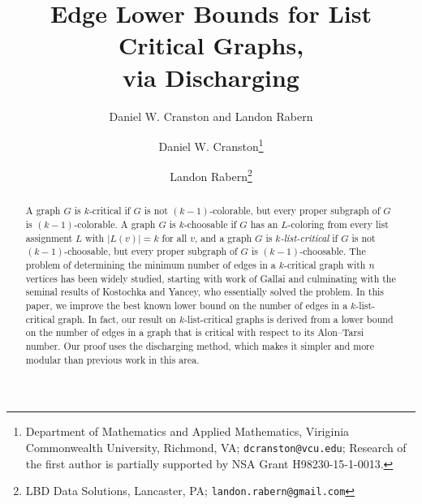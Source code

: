 \documentclass[12pt]{article}
\title{Edge Lower Bounds for List Critical Graphs,\\ via Discharging}
\author{Daniel W. Cranston and Landon Rabern}
\author{Daniel W. Cranston\thanks{Department of Mathematics and Applied
Mathematics, Viriginia Commonwealth University, Richmond, VA;
\texttt{dcranston@vcu.edu}; 
Research of the first author is partially supported by NSA Grant
H98230-15-1-0013.}
\and
Landon Rabern\thanks{LBD Data Solutions, Lancaster, PA;
\texttt{landon.rabern@gmail.com}}
	}
\theoremstyle{plain}
\theoremstyle{definition}
\theoremstyle{remark}
\begin{document}
\maketitle
\begin{abstract}
A graph $G$ is $k$-critical if $G$ is not $(k-1)$-colorable, but every proper
subgraph of $G$ is $(k-1)$-colorable.
A graph $G$ is $k$-choosable if $G$ has an $L$-coloring from every list
assignment $L$ with $|L(v)|=k$ for all $v$, and a graph $G$ is
\emph{$k$-list-critical} if $G$ is not $(k-1)$-choosable, but every
proper subgraph of $G$ is $(k-1)$-choosable.  The problem of determining
the minimum number of edges in a $k$-critical graph with $n$ vertices has been
widely studied, starting
with work of Gallai and culminating with the seminal results of Kostochka and
Yancey, who essentially solved the problem.  In this paper, we improve the best
known lower bound on the number of edges in a $k$-list-critical graph.  In fact,
our result on $k$-list-critical graphs is derived from a lower bound on the
number of edges in a graph that is critical with respect to its Alon--Tarsi
number.  Our proof uses the discharging method, which makes it simpler and more
modular than previous work in this area.
\end{abstract}
\end{document}
